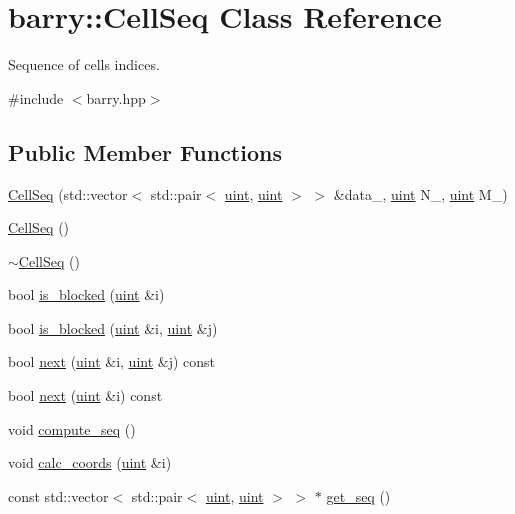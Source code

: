 \hypertarget{classbarry_1_1_cell_seq}{}\section{barry\+:\+:Cell\+Seq Class Reference}
\label{classbarry_1_1_cell_seq}


Sequence of cells indices.  




{\ttfamily \#include $<$barry.\+hpp$>$}

\subsection*{Public Member Functions}
\begin{DoxyCompactItemize}
\item 
\hyperlink{classbarry_1_1_cell_seq_a3f1fcc18a3e9a9572d403791368f0db7}{Cell\+Seq} (std\+::vector$<$ std\+::pair$<$ \hyperlink{namespacebarry_a11dfc53ddb4672278319aa04f1e09a6c}{uint}, \hyperlink{namespacebarry_a11dfc53ddb4672278319aa04f1e09a6c}{uint} $>$ $>$ \&data\+\_\+, \hyperlink{namespacebarry_a11dfc53ddb4672278319aa04f1e09a6c}{uint} N\+\_\+, \hyperlink{namespacebarry_a11dfc53ddb4672278319aa04f1e09a6c}{uint} M\+\_\+)
\item 
\hyperlink{classbarry_1_1_cell_seq_adaef92a0551e50ac803c2f8f2d54d6a9}{Cell\+Seq} ()
\item 
\hyperlink{classbarry_1_1_cell_seq_a3af19bd8e8ea575565bc0fa9fe66158d}{$\sim$\+Cell\+Seq} ()
\item 
bool \hyperlink{classbarry_1_1_cell_seq_a994900efdcf73e7619f728d584e92c5a}{is\+\_\+blocked} (\hyperlink{namespacebarry_a11dfc53ddb4672278319aa04f1e09a6c}{uint} \&i)
\item 
bool \hyperlink{classbarry_1_1_cell_seq_a5a5730ec094c9a4251753302a9504149}{is\+\_\+blocked} (\hyperlink{namespacebarry_a11dfc53ddb4672278319aa04f1e09a6c}{uint} \&i, \hyperlink{namespacebarry_a11dfc53ddb4672278319aa04f1e09a6c}{uint} \&j)
\item 
bool \hyperlink{classbarry_1_1_cell_seq_a05687b1000bcce13c0f81c0203363ce7}{next} (\hyperlink{namespacebarry_a11dfc53ddb4672278319aa04f1e09a6c}{uint} \&i, \hyperlink{namespacebarry_a11dfc53ddb4672278319aa04f1e09a6c}{uint} \&j) const
\item 
bool \hyperlink{classbarry_1_1_cell_seq_aa294a7d0620ff938150094b0b3e895a5}{next} (\hyperlink{namespacebarry_a11dfc53ddb4672278319aa04f1e09a6c}{uint} \&i) const
\item 
void \hyperlink{classbarry_1_1_cell_seq_a6588fe1ad4e37f7a845386eca46c13c2}{compute\+\_\+seq} ()
\item 
void \hyperlink{classbarry_1_1_cell_seq_aa3814680024ba20695c8846c4dae7036}{calc\+\_\+coords} (\hyperlink{namespacebarry_a11dfc53ddb4672278319aa04f1e09a6c}{uint} \&i)
\item 
const std\+::vector$<$ std\+::pair$<$ \hyperlink{namespacebarry_a11dfc53ddb4672278319aa04f1e09a6c}{uint}, \hyperlink{namespacebarry_a11dfc53ddb4672278319aa04f1e09a6c}{uint} $>$ $>$ $\ast$ \hyperlink{classbarry_1_1_cell_seq_a12235ff9c4a0183ed477679b61c4a19a}{get\+\_\+seq} ()
\end{DoxyCompactItemize}
